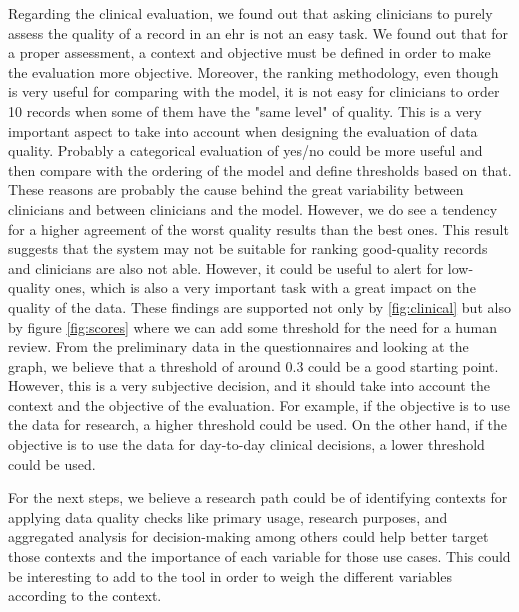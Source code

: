 Regarding the clinical evaluation, we found out that asking clinicians to purely assess the quality of a record in an ehr is not an easy task. We found out that for a proper assessment, a context and objective must be defined in order to make the evaluation more objective. Moreover, the ranking methodology, even though is very useful for comparing with the model, it is not easy for clinicians to order 10 records when some of them have the "same level" of quality. This is a very important aspect to take into account when designing the evaluation of data quality. Probably a categorical evaluation of yes/no could be more useful and then compare with the ordering of the model and define thresholds based on that. These reasons are probably the cause behind the great variability between clinicians and between clinicians and the model. However, we do see a tendency for a higher agreement of the worst quality results than the best ones. 
This result suggests that the system may not be suitable for ranking good-quality records and clinicians are also not able. However, it could be useful to alert for low-quality ones, which is also a very important task with a great impact on the quality of the data. These findings are supported not only by \ref*{fig:clinical} but also by figure \ref*{fig:scores} where we can add some threshold for the need for a human review. From the preliminary data in the questionnaires and looking at the graph, we believe that a threshold of around 0.3 could be a good starting point. However, this is a very subjective decision, and it should take into account the context and the objective of the evaluation. For example, if the objective is to use the data for research, a higher threshold could be used. On the other hand, if the objective is to use the data for day-to-day clinical decisions, a lower threshold could be used.


For the next steps, we believe a research path could be of identifying contexts for applying data quality checks like primary usage, research purposes, and aggregated analysis for decision-making among others could help better target those contexts and the importance of each variable for those use cases. This could be interesting to add to the tool in order to weigh the different variables according to the context. 

